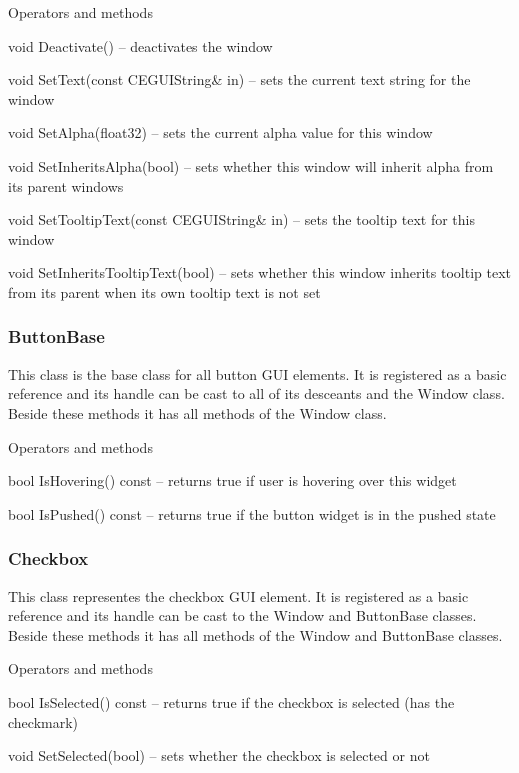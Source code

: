 \begin{titled-itemize}{Operators and methods}
  \item void Deactivate() -- deactivates the window
  \item void SetText(const CEGUIString\& in) -- sets the current text string for the window
  \item void SetAlpha(float32) -- sets the current alpha value for this window
  \item void SetInheritsAlpha(bool) -- sets whether this window will inherit alpha from its parent windows
  \item void SetTooltipText(const CEGUIString\& in) -- sets the tooltip text for this window
  \item void SetInheritsTooltipText(bool) -- sets whether this window inherits tooltip text from its parent when its
 own tooltip text is not set
\end{titled-itemize}

\subsubsection{ButtonBase}

This class is the base class for all button GUI elements. It is registered as a basic reference and its handle can be cast to all of its desceants and the Window class. Beside these methods it has all methods of the Window class.

\begin{titled-itemize}{Operators and methods}
  \item bool IsHovering() const -- returns true if user is hovering over this widget
  \item bool IsPushed() const -- returns true if the button widget is in the pushed state
\end{titled-itemize}

\subsubsection{Checkbox}

This class representes the checkbox GUI element. It is registered as a basic reference and its handle can be cast to the Window and ButtonBase classes. Beside these methods it has all methods of the Window and ButtonBase classes.

\begin{titled-itemize}{Operators and methods}
  \item bool IsSelected() const -- returns true if the checkbox is selected (has the checkmark)
  \item void SetSelected(bool) -- sets whether the checkbox is selected or not
\end{titled-itemize}

